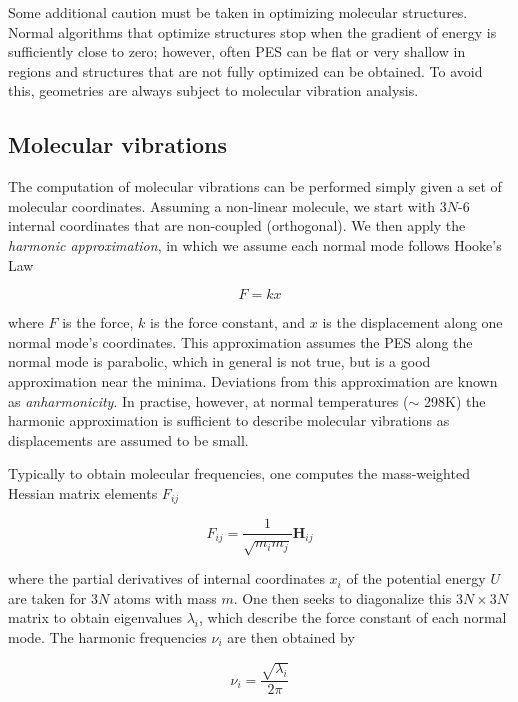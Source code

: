 \begin{doublespace}
Some additional caution must be taken in optimizing molecular structures.
Normal algorithms that optimize structures stop when the gradient of energy is
sufficiently close to zero; however, often PES can be flat or very shallow in
regions and structures that are not fully optimized can be obtained. To avoid
this, geometries are always subject to molecular vibration analysis.

\subsection{Molecular vibrations}

The computation of molecular vibrations can be performed simply given a set of
molecular coordinates.\cite{Wilson1980} Assuming a non-linear molecule, we
start with 3$N$-6 internal coordinates that are non-coupled (orthogonal). We
then apply the \emph{harmonic approximation}, in which we assume each normal
mode follows Hooke's Law

\begin{equation}
  F = kx
\end{equation}


\noindent where $F$ is the force, $k$ is the force constant, and $x$ is the
displacement along one normal mode's coordinates. This approximation assumes
the PES along the normal mode is parabolic, which in general is not true, but
is a good approximation near the minima. Deviations from this approximation are
known as \emph{anharmonicity}. In practise, however, at normal temperatures
($\sim$ 298K) the harmonic approximation is sufficient to describe molecular
vibrations as displacements are assumed to be small.

Typically to obtain molecular frequencies, one computes the mass-weighted
Hessian matrix elements $F_{ij}$

\begin{equation}
  F_{ij} = \frac{1}{\sqrt{m_i m_j}} \mathbf{H}_{ij}
\end{equation}

\noindent where the partial derivatives of internal coordinates $x_i$ of the
potential energy $U$ are taken for 3$N$ atoms with mass $m$. One then seeks to
diagonalize this $3N\times3N$ matrix to obtain eigenvalues $\lambda_i$, which
describe the force constant of each normal mode. The harmonic frequencies
$\nu_i$ are then obtained by

\begin{equation}
  \nu_i = \frac{\sqrt{\lambda_i}}{2\pi}
\end{equation}


\end{doublespace}
